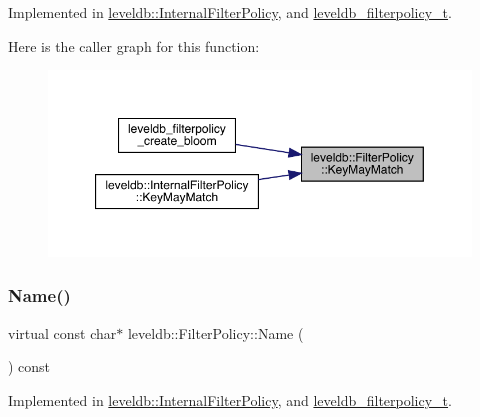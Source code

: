 Implemented in \mbox{\hyperlink{classleveldb_1_1_internal_filter_policy_aba61cb2c01f6c1d34128f115903ff559}{leveldb\+::\+Internal\+Filter\+Policy}}, and \mbox{\hyperlink{structleveldb__filterpolicy__t_a76ed49d956a58622e86d87a89a9ba1f1}{leveldb\+\_\+filterpolicy\+\_\+t}}.

Here is the caller graph for this function\+:
\nopagebreak
\begin{figure}[H]
\begin{center}
\leavevmode
\includegraphics[width=350pt]{classleveldb_1_1_filter_policy_a6f8ba10ea25e0b4b8d0a6607c361c718_icgraph}
\end{center}
\end{figure}
\mbox{\label{classleveldb_1_1_filter_policy_afd5e951892a2e740f186c0658913ea1b}} 
\subsubsection{\texorpdfstring{Name()}{Name()}}
{\footnotesize\ttfamily virtual const char$\ast$ leveldb\+::\+Filter\+Policy\+::\+Name (\begin{DoxyParamCaption}{ }\end{DoxyParamCaption}) const\hspace{0.3cm}{\ttfamily [pure virtual]}}



Implemented in \mbox{\hyperlink{classleveldb_1_1_internal_filter_policy_aea56a32a2be2ad99f41c2009af823b44}{leveldb\+::\+Internal\+Filter\+Policy}}, and \mbox{\hyperlink{structleveldb__filterpolicy__t_a94f31f3d4576ed53d9277e461717e9f3}{leveldb\+\_\+filterpolicy\+\_\+t}}.

